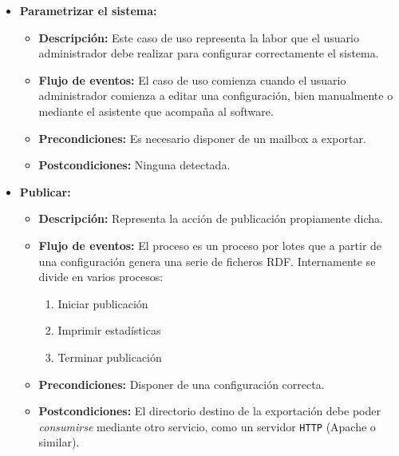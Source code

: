 \begin{itemize}

  \item \textbf{Parametrizar el sistema:}
 	\begin{itemize}
 	  \item \textbf{Descripción:} Este caso de uso representa la labor 
		que el usuario administrador debe realizar para configurar 
		correctamente el sistema.
 	  \item \textbf{Flujo de eventos:} El caso de uso comienza cuando el
		usuario administrador comienza a editar una configuración, 
		bien manualmente o mediante el asistente que acompaña al 
		software.
	  \item \textbf{Precondiciones:} Es necesario disponer de un mailbox
		a exportar.
	  \item \textbf{Postcondiciones:} Ninguna detectada.
	\end{itemize}

  \item \textbf{Publicar:}
 	\begin{itemize}
 	  \item \textbf{Descripción:} Representa la acción de publicación 
		propiamente dicha.
 	  \item \textbf{Flujo de eventos:} El proceso es un proceso por 
		lotes que a partir de una configuración genera una serie 
		de ficheros RDF. Internamente se divide en varios procesos:
		\begin{enumerate}
		 \item Iniciar publicación
		 \item Imprimir estadísticas
		 \item Terminar publicación
		\end{enumerate}
	  \item \textbf{Precondiciones:} Disponer de una configuración correcta.
	  \item \textbf{Postcondiciones:} El directorio destino de la exportación
		debe poder \emph{consumirse} mediante otro servicio, como un 
		servidor \texttt{HTTP} (Apache o similar).
	\end{itemize}


\end{itemize}
